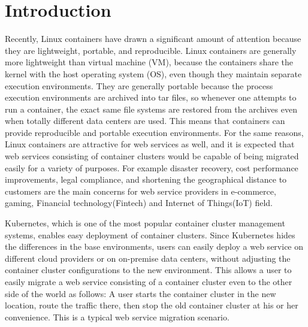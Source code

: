 \section{Introduction}

Recently, Linux containers have drawn a significant amount of attention because they are lightweight, portable, and reproducible.
Linux containers are generally more lightweight than virtual machine (VM), because the containers share the kernel with the host operating system (OS), even though they maintain separate execution environments.
They are generally portable because the process execution environments are archived into tar files,
so whenever one attempts to run a container, the exact same file systems are restored from the archives
even when totally different data centers are used.
This means that containers can provide reproducible and portable execution environments.
%
For the same reasons, Linux containers are attractive for web services as well,
and it is expected that web services consisting of container clusters would be
capable of being migrated easily for a variety of purposes. For example disaster recovery,
cost performance improvements, legal compliance, and shortening the geographical distance to customers
are the main concerns for web service providers in e-commerce, gaming, Financial technology(Fintech) and Internet of Things(IoT) field.
%

Kubernetes\cite{K8s2017}, which is one of the most popular container cluster management systems, 
enables easy deployment of container clusters.
Since Kubernetes hides the differences in the base environments, users can easily deploy a web service on different 
cloud providers or on on-premise data centers, without adjusting the container cluster configurations to the new environment. 
This allows a user to easily migrate a web service consisting of a container cluster even to the other side of the world as follows: 
A user starts the container cluster in the new location, route the traffic there, 
then stop the old container cluster at his or her convenience.
This is a typical web service migration scenario.

